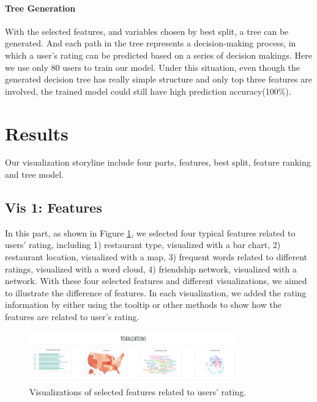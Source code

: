 \documentclass{vgtc}                          %
\begin{document}
\paragraph{Tree Generation}
With the selected features, and variables chosen by best split, a tree can be generated. And each path in the tree represents a decision-making process, in which a user's rating can be predicted based on a series of decision makings. Here we use only 80 users to train our model. Under this situation, even though the generated decision tree has really simple structure and only top three features are involved, the trained model could still have high prediction accuracy(100\%).

\section{Results}

Our visualization storyline include four parts, features, best split, feature ranking and tree model. 

\subsection{Vis 1: Features}

In this part, as shown in Figure \ref{fig:vis_1}, we selected four typical features related to users' rating, including 1) restaurant type, visualized with a bar chart, 2) restaurant location, visualized with a map, 3) frequent words related to different ratings, visualized with a word cloud, 4) friendship network, visualized with a network. With these four selected features and different visualizations, we aimed to illustrate the difference of features. In each visualization, we added the rating information by either using the tooltip or other methods to show how the features are related to user's rating. 

\begin{figure}[h]
  \centering
  \includegraphics[width=9cm]{vis_1.png}
  \caption{Visualizations of selected features related to users' rating.}
  \label{fig:vis_1}
\end{figure}
\end{document}
